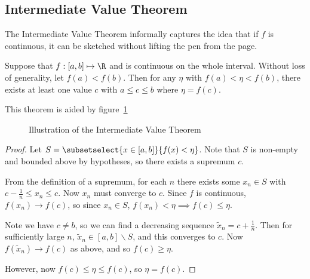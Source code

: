 \documentclass[../Main.tex]{subfiles}
\begin{document}
\subsection{Intermediate Value Theorem}
The Intermediate Value Theorem informally captures the idea that if $f$ is continuous, it can be sketched without lifting the pen from the page.
\begin{theorem}
    Suppose that $f : [a, b] \mapsto \R$ and is continuous on the whole interval. Without loss of generality, let $f(a) < f(b)$. Then for any $\eta$ with $f(a) < \eta < f(b)$, there exists at least one value $c$ with $a \leq c \leq b$ where $\eta = f(c)$.
    \label{thmIntermediateVal}
\end{theorem}
This theorem is aided by figure~\ref{figIntermediateValue}
\begin{figure}[ht]
    \centering
    \caption{Illustration of the Intermediate Value Theorem}
    \label{figIntermediateValue}
\end{figure}
\begin{proof}
    Let $S = \subsetselect{x \in [a, b]}{f(x) < \eta}$. Note that $S$ is non-empty and bounded above by hypotheses, so there exists a supremum $c$.\par
    From the definition of a supremum, for each $n$ there exists some $x_n \in S$ with $c - \frac{1}{n} \leq x_n \leq c$. Now $x_n$ must converge to $c$. Since $f$ is continuous, $f(x_n) \to f(c)$, so since $x_n \in S$, $f(x_n) < \eta \implies f(c) \leq \eta$.\par
    Note we have $c \neq b$, so we can find a decreasing sequence $\tilde{x}_n = c + \frac{1}{n}$. Then for sufficiently large $n$, $\tilde{x}_n \in [a, b] \backslash S$, and this converges to $c$. Now $f(\tilde{x}_n) \to f(c)$ as above, and so $f(c) \geq \eta$.\par
    However, now $f(c) \leq \eta \leq f(c)$, so $\eta = f(c)$.
\end{proof}
\end{document}
